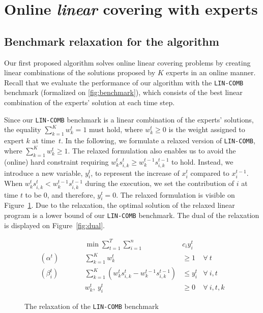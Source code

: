 
\section{Online \emph{linear} covering with experts}	\label{sec:covering}

\subsection{Benchmark relaxation for the algorithm}

Our first proposed algorithm solves online linear covering problems by creating linear combinations of the solutions proposed by $K$ experts in an online manner.
Recall that we evaluate the performance of our algorithm with the \texttt{LIN-COMB} benchmark (formalized on \cref{fig:benchmark}), which consists of the best linear combination of the experts' solution at each time step.

Since our \texttt{LIN-COMB} benchmark is a linear combination of the experts' solutions, the equality $ \sum_{k=1}^{K} w_{k}^{t} = 1$ must hold, where $w_{k}^{t} \geq 0$ is the weight assigned to expert $k$ at time~$t$. In the following, we formulate a relaxed version of \texttt{LIN-COMB}, where
$\sum_{k=1}^{K} w_{k}^{t} \geq 1$. The relaxed formulation also enables us to avoid the (online) hard constraint requiring $w_{k}^{t} s_{i,k}^{t} \geq w_{k}^{t-1} s_{i,k}^{t-1}$ to hold. Instead, we introduce a new variable, $y_{i}^{t}$, to represent the increase of $x_{i}^{t}$ compared to $x_{i}^{t-1}$. When $w_{k}^{t} s_{i,k}^{t} < w_{k}^{t-1} s_{i,k}^{t-1}$ during the execution, we set the contribution of $i$ at time $t$ to be 0, and therefore, $y_{i}^{t} = 0$.
The relaxed formulation is visible on Figure~\ref{fig:relaxation}. Due to the relaxation, the optimal solution of the relaxed linear program is a lower bound of our \texttt{LIN-COMB} benchmark. The dual of the relaxation is displayed on Figure~\ref{fig:dual}.


\begin{figure}
	\begin{mdframed}
		\vspace{-10pt}
		\begin{align*}
			&& \min \sum_{t = 1}^{T} \sum_{i=1}^{n} & c_i y_i^t \\
			(\alpha^{t}) \qquad && \sum_{k=1}^{K} w_{k}^{t} & \geq 1  & \forall\ t \\
			(\beta_{i}^{t}) \qquad && \sum_{k=1}^{K} \left(w_{k}^{t} s_{i,k}^{t} - w_{k}^{t-1} s_{i,k}^{t-1} \right) &\leq y_i^t  &\forall\ i,t\\
			&& w_{k}^{t},\ y_{i}^{t} & \ge 0 & \forall\ i,t,k
		\end{align*}
	\end{mdframed}
	\caption{The relaxation of the \texttt{LIN-COMB} benchmark}
	\label{fig:relaxation}
\end{figure}

